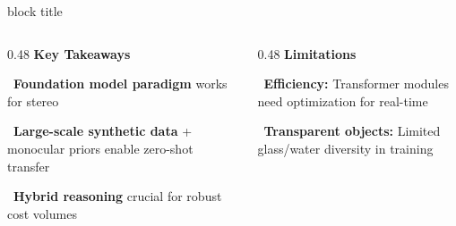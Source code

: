 \documentclass[final]{beamer}
\begin{document}
\begin{frame}[t]
\vspace{0.8cm}

\begin{beamercolorbox}[wd=\paperwidth, leftskip=2.5cm, rightskip=2.5cm, vmode]{block title}
  \vspace{0.8cm}
  \begin{columns}[t, totalwidth=\dimexpr\paperwidth-5cm\relax]
    \begin{column}{0.48\linewidth}
      {\large\bfseries Key Takeaways}\par
      \vspace{0.3cm}
      {\small
        \checkmark\ \textbf{Foundation model paradigm} works for stereo\par
        \vspace{0.2cm}
        \checkmark\ \textbf{Large-scale synthetic data} + monocular priors enable zero-shot transfer\par
        \vspace{0.2cm}
        \checkmark\ \textbf{Hybrid reasoning} crucial for robust cost volumes
      }
    \end{column}
    \begin{column}{0.48\linewidth}
      {\large\bfseries Limitations}\par
      \vspace{0.3cm}
      {\small
        \textbullet\ \textbf{Efficiency:} Transformer modules need optimization for real-time\par
        \vspace{0.2cm}
        \textbullet\ \textbf{Transparent objects:} Limited glass/water diversity in training
      }
    \end{column}
  \end{columns}
  \vspace{0.8cm}
\end{beamercolorbox}

\end{frame}
\end{document}
